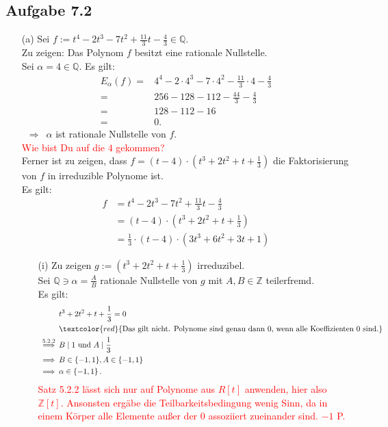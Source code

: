 \documentclass[12pt]{article}
\newcommand{\corr}[1]{\textcolor{red}{#1}}
\newcommand{\df}{\enspace\Longrightarrow\enspace}
\begin{document}
\subsection*{Aufgabe 7.2}
\begin{enumerate}
	\item[(a)] Sei $f:=t^4-2t^3-7t^2+\frac{11}{3}t-\frac{4}{3}\in\mathbb{Q}$. \\
	Zu zeigen: Das Polynom $f$ besitzt eine rationale Nullstelle. \\
	Sei $\alpha=4\in\mathbb{Q}$. Es gilt:
	\begin{align*}
		E_\alpha(f)=&4^4-2\cdot4^3-7\cdot4^2-\frac{11}{3}\cdot4-\frac{4}{3} \\
		=&256-128-112-\frac{44}{3}-\frac{4}{3} \\
		=&128-112-16 \\
		=&0.
	\end{align*}
	$\df \alpha$ ist rationale Nullstelle von $f$. \\
\corr{Wie bist Du auf die $4$ gekommen?}\\
	Ferner ist zu zeigen, dass $f=\left(t-4\right)\cdot\left(t^3+2t^2+t+\frac{1}{3}\right)$ die Faktorisierung von $f$ in irreduzible Polynome ist. \\
	Es gilt:
	\begin{align*}
		f&=t^4-2t^3-7t^2+\frac{11}{3}t-\frac{4}{3} \\
		&=\left(t-4\right)\cdot\left(t^3+2t^2+t+\frac{1}{3}\right) \\
		&=\frac{1}{3}\cdot\left(t-4\right)\cdot\left(3t^3+6t^2+3t+1\right)
	\end{align*}
	\begin{enumerate}
		\item[(i)] Zu zeigen $g:=\left(t^3+2t^2+t+\frac{1}{3}\right)$ irreduzibel. \\
		Sei $\mathbb{Q}\ni\alpha=\frac{A}{B}$ rationale Nullstelle von $g$ mit $A,B\in\mathbb{Z}$ teilerfremd.\\
		Es gilt:
		\begin{align*}
			& t^3+2t^2+t+\frac{1}{3}=0 \\
&\corr{\text{Das gilt nicht. Polynome sind genau dann 0, wenn alle Koeffizienten 0 sind.}}\\
			\overset{5.2.2}{\df} &B\mid1\text{ und }A\mid\frac{1}{3} \\
			\df &B\in\{-1,1\},A\in\{-1,1\} \\
			\df &\alpha\in\left\{-1,1\right\}.
		\end{align*}
\corr{Satz 5.2.2 lässt sich nur auf Polynome aus $R[t]$ anwenden, hier also $\mathbb{Z}[t]$. Ansonsten ergäbe die Teilbarkeitsbedingung wenig Sinn, da in einem Körper alle Elemente außer der 0 assoziiert zueinander sind. $-1$ P.}\\

\end{enumerate}
\end{enumerate}
\end{document}
